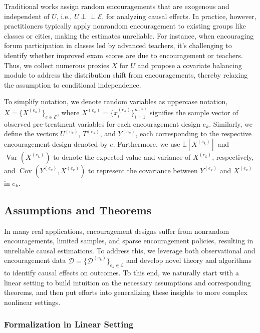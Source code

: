 \documentclass[journal]{IEEEtran}
\newcommand{\indep}{\perp \!\!\! \perp}
\begin{document}
Traditional works assign random encouragements that are exogenous and independent of $U$, i.e., $U \indep \mathcal{E}$, for analyzing causal effects. In practice, however, practitioners typically apply nonrandom encouragement to existing groups like classes or cities, making the estimates unreliable. For instance, when encouraging forum participation in classes led by advanced teachers, it's challenging to identify whether improved exam scores are due to encouragement or teachers. Thus, we collect numerous proxies $X$ for $U$ and propose a covariate balancing module to address the distribution shift from encouragements, thereby relaxing the assumption to conditional independence.

To simplify notation, we denote random variables as uppercase notation, $X = \{X^{(e_k)}\}_{e \in \mathcal{E}}$, where $X^{(e_k)} = \{x_i^{(e_k)}\}_{i=1}^{n^{(e_k)}}$ signifies the sample vector of observed pre-treatment variables for each encouragement design $e_k$. Similarly, we define the vectors $U^{(e_k)}$, $T^{(e_k)}$, and $Y^{(e_k)}$, each corresponding to the respective encouragement design denoted by $e$.
Furthermore, we use $\mathbb{E}[X^{(e_k)}]$ and ${\operatorname{Var}\left(X^{(e_k)}\right)}$ to denote the expected value and variance of $X^{(e_k)}$, respectively, and ${\operatorname{Cov}\left(Y^{(e_k)}, X^{(e_k)}\right)}$ to represent the covariance between $Y^{(e_k)}$ and $X^{(e_k)}$ in $e_k$. 


\subsection{Assumptions and Theorems}

In many real applications, encouragement designs suffer from nonrandom encouragements, limited samples, and sparse encouragement policies, resulting in unreliable causal estimations.
To address this,
we leverage both observational and encouragement data $\mathcal{D} = \{ \mathcal{D}^{(e_k)} \}_{e_k \in \mathcal{E}}$ and develop novel theory and algorithms to identify causal effects on outcomes. To this end, we naturally start with a linear setting to build intuition on the necessary assumptions and corresponding theorems, and then put efforts into generalizing these insights to more complex nonlinear settings.

\subsubsection{Formalization in Linear Setting}
\end{document}
